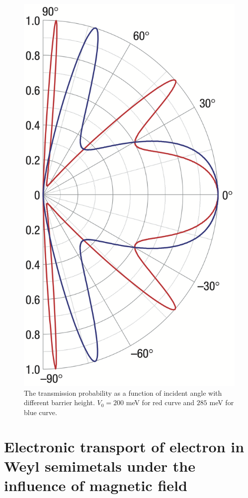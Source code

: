    \begin{figure}[H]
        \centering
        \includegraphics[width = 0.3\linewidth]{fig/Chap 2/klein tunneling.png}
        \caption{The transmission probability as a function of incident angle with different barrier height. 
                    $V_0 = 200$ meV for red curve and $285$ meV for blue curve.}
        \label{2fig:Klein tunneling}
    \end{figure}

\section{Electronic transport of electron in Weyl semimetals under the influence of magnetic field} \label{2sec:transport in B field}

